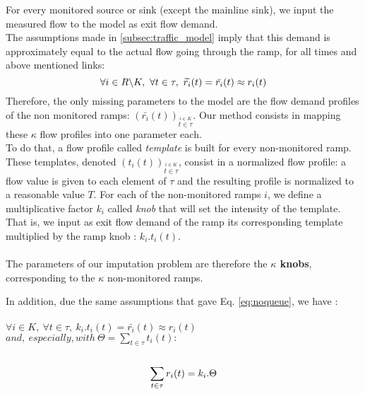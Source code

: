 For every monitored source or sink (except the mainline sink), we input the measured flow to the model as exit flow demand.\\ The assumptions made in \ref{subsec:traffic_model} imply that this demand is approximately equal to the actual flow going through the ramp, for all times and above mentioned links:\\
\begin{equation}
	\label{eq:noqueue}
	\forall i\in R\backslash K,\ \forall t\in \tau,\ \widetilde{r_{i}}(t)=\bar{r_{i}}(t)\approx {r_{i}}(t)\\
\end{equation}
Therefore, the only missing parameters to the model are the flow demand profiles of the non monitored ramps: $(\bar{r_{i}}(t))_{\stackrel{i\in K}{t \in{\tau}}}$.
Our method consists in mapping these $\kappa$ flow profiles into one parameter each.\\
To do that, a flow profile called \emph{template} is built for every non-monitored ramp. These templates, denoted $(t_{i}(t))_{\stackrel{i\in{K}}{t \in{\tau}}}$, consist in a normalized flow profile: a flow value is given to each element of $\tau$ and the resulting profile is normalized to a reasonable value $T$.
For each of the non-monitored ramps $i$, we define a multiplicative factor $k_{i}$ called \emph{knob} that will set the intensity of the template. 
That is, we input as exit flow demand of the ramp its corresponding template multiplied by the ramp knob : $k_{i}.t_{i}(t)$.\\
\\
The parameters of our imputation problem are therefore the \textbf{$\kappa$ knobs}, corresponding to the $\kappa$ non-monitored ramps.

In addition, due the same assumptions that gave Eq. \ref{eq:noqueue}, we have :\\
\\
$\forall i \in K,\ \forall t\in \tau,\ k_{i}.t_{i}(t)=\bar{r_{i}}(t)\approx r_{i}(t)$\\
$and,\ especially, with\ \Theta=\sum\limits_{t\in\tau}t_{i}(t):$\\
\\
\begin{equation}
	\label{eq:noqueuetemplate}
	\sum\limits_{t \in \tau} r_{i}(t)=k_{i}.\Theta\\
\end{equation}